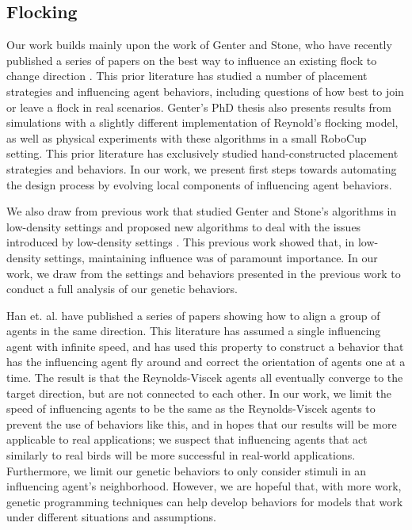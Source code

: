 \subsection{Flocking}
\label{sec:relatedflocking}
Our work builds mainly upon the work of Genter and Stone, who have recently
published a series of papers on the best way to influence an existing flock to
change direction \cite{genter2015placement, genter2014neighborsorientherd,
genter2013visionstationary, genter2013backsearch,
genter2016facegoalfacecurrent, genter201612steplookahead}.
This prior literature has studied a number of placement strategies and influencing
agent behaviors, including questions of how best to join or leave a flock in real
scenarios.
Genter's PhD thesis also presents results from simulations with a slightly
different implementation of Reynold's flocking model, as well as physical
experiments with these algorithms in a small RoboCup setting.
This prior literature has exclusively studied hand-constructed placement
strategies and behaviors.
In our work, we present first steps towards automating the design process by
evolving local components of influencing agent behaviors.

We also draw from previous work that studied Genter and Stone's algorithms in
low-density settings and proposed new algorithms to deal with the issues
introduced by low-density settings \cite{Fu2017}.
This previous work showed that, in low-density settings, maintaining influence
was of paramount importance.
In our work, we draw from the settings and behaviors presented in the previous
work to conduct a full analysis of our genetic behaviors.

Han et. al. have \cite{han2010teleporting} published a series of papers showing how
to align a group of agents in the same direction.
This literature has assumed a single influencing agent with infinite speed, and
has used this property to construct a behavior that has the influencing agent
fly around and correct the orientation of agents one at a time.
The result is that the Reynolds-Viscek agents all eventually converge to the target
direction, but are not connected to each other.
In our work, we limit the speed of influencing agents to be the same as the
Reynolds-Viscek agents to prevent the use of behaviors like this, and in hopes
that our results will be more applicable to real applications; we suspect that
influencing agents that act similarly to real birds will be more successful in
real-world applications.
Furthermore, we limit our genetic behaviors to only consider stimuli in an
influencing agent's neighborhood.
However, we are hopeful that, with more work, genetic programming techniques
can help develop behaviors for models that work under different situations and
assumptions.

